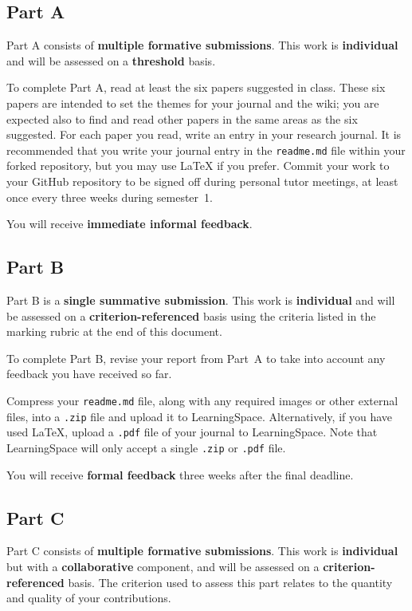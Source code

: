 \documentclass{../fal_assignment}
\begin{document}
\subsection*{Part A}

Part A consists of \textbf{multiple formative submissions}. This work is \textbf{individual} and will be assessed on a \textbf{threshold} basis.

To complete Part A, read at least the six papers suggested in class.
These six papers are intended to set the themes for your journal and the wiki;
you are expected also to find and read other papers in the same areas as the six suggested.
For each paper you read, write an entry in your research journal.
It is recommended that you write your journal entry in the \texttt{readme.md} file within your forked repository,
but you may use LaTeX if you prefer.
Commit your work to your GitHub repository to be signed off during personal tutor meetings,
at least once every three weeks during semester~1.

You will receive \textbf{immediate informal feedback}.

\subsection*{Part B}

Part B is a \textbf{single summative submission}. This work is \textbf{individual} and will be assessed on a \textbf{criterion-referenced} basis
using the criteria listed in the marking rubric at the end of this document.

To complete Part B, revise your report from Part~A to take into account any feedback you have received so far.

Compress your \texttt{readme.md} file, along with any required images or other external files,
into a \texttt{.zip} file and upload it to LearningSpace.
Alternatively, if you have used LaTeX, upload a \texttt{.pdf} file of your journal to LearningSpace.
Note that LearningSpace will only accept a single \texttt{.zip} or \texttt{.pdf} file.

You will receive \textbf{formal feedback} three weeks after the final deadline.

\subsection*{Part C}

Part C consists of \textbf{multiple formative submissions}. This work is \textbf{individual} but with a \textbf{collaborative} component, and will be assessed on a \textbf{criterion-referenced} basis.
The criterion used to assess this part relates to the quantity and quality of your contributions.
\end{document}
